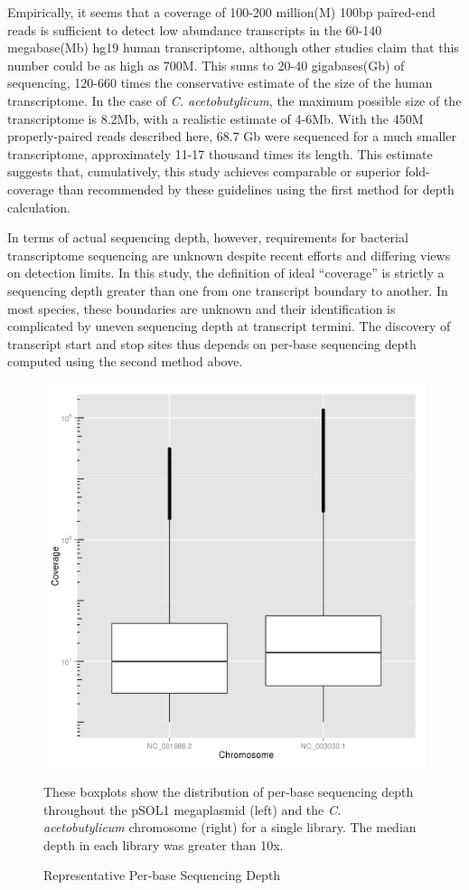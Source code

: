 Empirically, it seems that a coverage of 100-200 million(M) 100bp paired-end reads is sufficient to detect low abundance transcripts in the 60-140 megabase(Mb) hg19 human transcriptome,\cite{110} although other studies claim that this number could be as high as 700M.\cite{185} This sums to 20-40 gigabases(Gb) of sequencing, 120-660 times the conservative estimate of the size of the human transcriptome. In the case of \textit{C. acetobutylicum}, the maximum possible size of the transcriptome is 8.2Mb, with a realistic estimate of 4-6Mb. With the 450M properly-paired reads described here, 68.7 Gb were sequenced for a much smaller transcriptome, approximately 11-17 thousand times its length. This estimate suggests that, cumulatively, this study achieves comparable or superior fold-coverage than recommended by these guidelines using the first method for depth calculation. 

In terms of actual sequencing depth, however, requirements for bacterial transcriptome sequencing are unknown despite recent efforts\cite{108,109,110,176,177} and differing views on detection limits.\cite{176,186} In this study, the definition of ideal ``coverage'' is strictly a sequencing depth greater than one from one transcript boundary to another. In most species, these boundaries are unknown and their identification is complicated by uneven sequencing depth at transcript termini.\cite{18} The discovery of transcript start and stop sites thus depends on per-base sequencing depth computed using the second method above.
\begin{figure}
\includegraphics[width=\textwidth]{images/Sequencing/Supplemental/BA-A-75+boxplot.png}
\caption{Representative Per-base Sequencing Depth}\label{fig:4.5}
These boxplots show the distribution of per-base sequencing depth throughout the pSOL1 megaplasmid (left) and the \textit{C. acetobutylicum} chromosome (right) for a single library. The median depth in each library was greater than 10x.
\end{figure}

